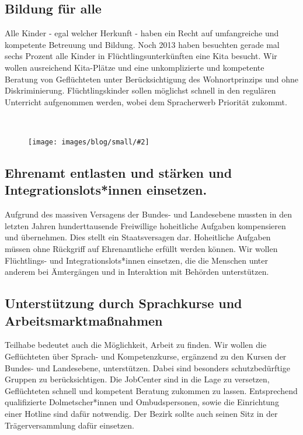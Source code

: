 \documentclass[a4paper,10pt]{article}
\newcommand{\mysection}[1]{{\vspace{1cm}\noindent\color{gray}{\ttfamily\LARGE\raggedright #1}\\\medskip}}
\newcommand{\abschnitt}[2]{%
\mysection{\raggedright #1}%
\begin{figure}[t]%
\vspace*{-2.7cm}%
\hspace*{-2.1cm}%
\texttt{[image: images/blog/small/\#2]} %
\end{figure}%
}
\begin{document}
\subsection*{\ttfamily Bildung für alle}\label{bildung-fuxfcr-alle}

Alle Kinder - egal welcher Herkunft - haben ein Recht auf umfangreiche
und kompetente Betreuung und Bildung. Noch 2013 haben besuchten gerade
mal sechs Prozent alle Kinder in Flüchtlingsunterkünften eine Kita
besucht. Wir wollen ausreichend Kita-Plätze und eine unkomplizierte und
kompetente Beratung von Geflüchteten unter Berücksichtigung des
Wohnortprinzips und ohne Diskriminierung. Flüchtlingskinder sollen
möglichst schnell in den regulären Unterricht aufgenommen werden, wobei
dem Spracherwerb Priorität zukommt.

\clearpage
\abschnitt{}{offyoucanfuck.jpg}
\subsection*{\ttfamily Ehrenamt entlasten und stärken und Integrationslots*innen
einsetzen.}\label{ehrenamt-entlasten-und-stuxe4rken-und-integrationslotsinnen-einsetzen.}

Aufgrund des massiven Versagens der Bundes- und Landesebene mussten in
den letzten Jahren hunderttausende Freiwillige hoheitliche Aufgaben
kompensieren und übernehmen. Dies stellt ein Staatsversagen dar.
Hoheitliche Aufgaben müssen ohne Rückgriff auf Ehrenamtliche erfüllt
werden können. Wir wollen Flüchtlings- und Integrationslots*innen
einsetzen, die die Menschen unter anderem bei Ämtergängen und in
Interaktion mit Behörden unterstützen.

\subsection*{\ttfamily Unterstützung durch Sprachkurse und
Arbeitsmarktmaßnahmen}\label{unterstuxfctzung-durch-sprachkurse-und-arbeitsmarktmauxdfnahmen}

Teilhabe bedeutet auch die Möglichkeit, Arbeit zu finden. Wir wollen die
Geflüchteten über Sprach- und Kompetenzkurse, ergänzend zu den Kursen
der Bundes- und Landesebene, unterstützen. Dabei sind besonders
schutzbedürftige Gruppen zu berücksichtigen. Die JobCenter sind in die
Lage zu versetzen, Geflüchteten schnell und kompetent Beratung zukommen
zu lassen. Entsprechend qualifizierte Dolmetscher*innen und
Ombudspersonen, sowie die Einrichtung einer Hotline sind dafür
notwendig. Der Bezirk sollte auch seinen Sitz in der Trägerversammlung
dafür einsetzen.
\end{document}
